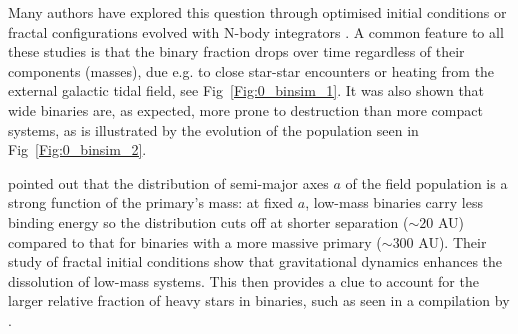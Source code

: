 Many authors have explored this question through optimised initial conditions \citep{Kroupa2001,Marks2012} or fractal configurations evolved with N-body integrators \citep{Parker2011,Geller2013,Parker2014}. A common feature to all these studies is that the binary fraction drops over time regardless of their components (masses), due e.g. to close star-star encounters or heating from the external galactic tidal field, see Fig~\ref{Fig:0_binsim_1}. It was also shown that wide binaries are, as expected, more prone to destruction than more compact systems, as is illustrated by the evolution of the population seen in Fig~\ref{Fig:0_binsim_2}.

 \cite{Parker2014} pointed out that the distribution of semi-major axes $a$ of the field population is a strong function of the primary's mass: at fixed $a$, low-mass binaries carry less binding energy so the distribution cuts off at shorter separation ($\sim 20 $ AU) compared to that for binaries with a more massive primary ($\sim 300$ AU). Their study of fractal initial conditions show that gravitational dynamics enhances the dissolution of low-mass systems. This then provides a clue to account for the larger relative fraction of heavy stars in binaries, such as seen in a compilation by \cite{Raghavan2010}. 
 
